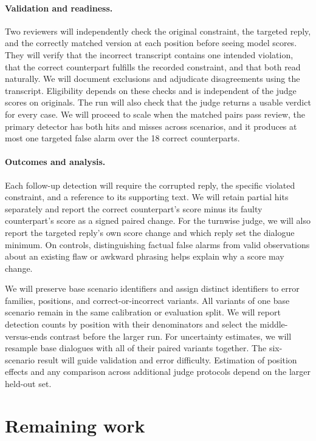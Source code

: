 \documentclass[11pt]{article}
\begin{document}
\paragraph{Validation and readiness.}
Two reviewers will independently check the original constraint, the targeted reply, and the correctly matched version at each position before seeing model scores. They will verify that the incorrect transcript contains one intended violation, that the correct counterpart fulfills the recorded constraint, and that both read naturally. We will document exclusions and adjudicate disagreements using the transcript. Eligibility depends on these checks and is independent of the judge scores on originals. The run will also check that the judge returns a usable verdict for every case. We will proceed to scale when the matched pairs pass review, the primary detector has both hits and misses across scenarios, and it produces at most one targeted false alarm over the 18 correct counterparts.

\paragraph{Outcomes and analysis.}
Each follow-up detection will require the corrupted reply, the specific violated constraint, and a reference to its supporting text. We will retain partial hits separately and report the correct counterpart's score minus its faulty counterpart's score as a signed paired change. For the turnwise judge, we will also report the targeted reply's own score change and which reply set the dialogue minimum. On controls, distinguishing factual false alarms from valid observations about an existing flaw or awkward phrasing helps explain why a score may change.

We will preserve base scenario identifiers and assign distinct identifiers to error families, positions, and correct-or-incorrect variants. All variants of one base scenario remain in the same calibration or evaluation split. We will report detection counts by position with their denominators and select the middle-versus-ends contrast before the larger run. For uncertainty estimates, we will resample base dialogues with all of their paired variants together. The six-scenario result will guide validation and error difficulty. Estimation of position effects and any comparison across additional judge protocols depend on the larger held-out set.

\section{Remaining work}
\end{document}
